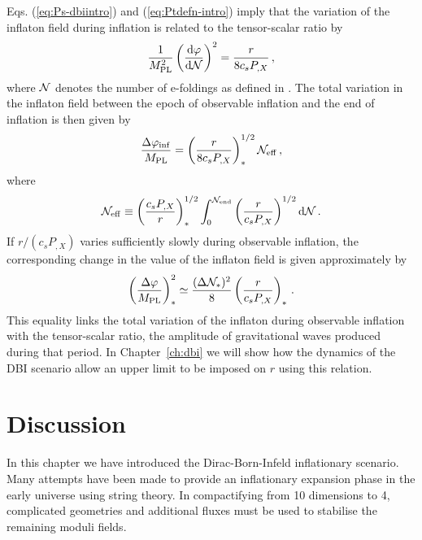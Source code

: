 Eqs. (\ref{eq:Ps-dbiintro}) and (\ref{eq:Ptdefn-intro}) imply 
that the variation of the inflaton field during inflation  
is related to the tensor-scalar ratio by \cite{lyth,bmpaper}
% 
\begin{equation}
\label{eq:genlyth-dbiintro}
\frac{1}{M_{\mathrm{PL}}^2}
\left( \frac{\mathrm{d} \varphi}{\mathrm{d} \mathcal{N}} \right)^2 = \frac{r}{8 c_s P_{,X}}
\,,
\end{equation}
% 
where $\mathcal{N}$ denotes the number of e-foldings as defined in
. 
The total variation in the inflaton field between the epoch of observable 
inflation and the end of inflation is then given by
% 
\begin{equation}
\label{eq:totalfield-dbiintro}
\frac{\Delta \varphi_{\rm inf}}{M_{\mathrm{PL}}} = 
\left( \frac{r}{8 c_s P_{,X}} \right)_*^{1/2} \mathcal{N}_\mathrm{eff} \,,
\end{equation}
% 
where
% 
\begin{equation}
\label{eq:Neff-dbiintro}
\mathcal{N}_\mathrm{eff} \equiv \left( \frac{c_sP_{,X}}{r}\right)_*^{1/2}
\int_0^{\mathcal{N}_{\rm end}}  
\left( \frac{r}{c_sP_{,X}} \right)^{1/2} \mathrm{d} \mathcal{N} \,.
\end{equation}
% 
If $r/(c_s P_{,X})$ varies 
sufficiently slowly during observable inflation, 
the corresponding change in the value of the inflaton  
field is given approximately by \cite{lyth,bmpaper}
% 
\begin{equation}
\label{eq:approxlyth-dbiintro}
\left( \frac{\Delta \varphi}{M_{\mathrm{PL}}} \right)_*^2 \simeq 
\frac{(\Delta \mathcal{N}_*)^2}{8} \left( \frac{r}{c_sP_{,X}} \right)_* \,.
\end{equation}
% 
This equality links the total variation of the inflaton during observable inflation
with the tensor-scalar ratio, \iec the amplitude of gravitational waves produced
during that period. In Chapter~\ref{ch:dbi} we will show how the dynamics of the
DBI scenario allow an upper limit to be imposed on $r$ using this relation.

\section{Discussion}
\label{sec:summary-dbiintro}
In this chapter we have introduced the Dirac-Born-Infeld inflationary scenario.
Many attempts have been made to provide an inflationary expansion phase in the
early universe using string theory. In compactifying from 10 dimensions to 4,
complicated geometries and additional fluxes must be used to stabilise the
remaining moduli fields. 

